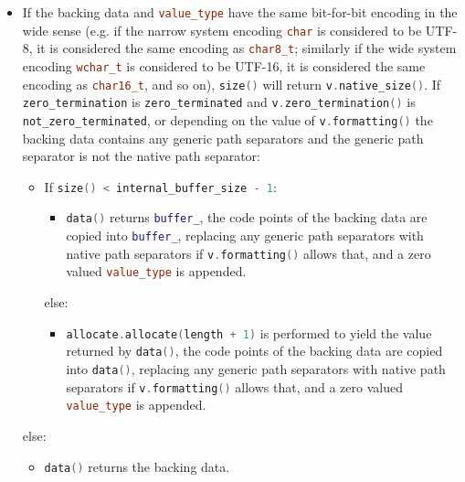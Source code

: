 \documentclass[11pt]{article}
\newcommand{\code}[2][cpp]{\lstinline[language=#1,basicstyle=\small\ttfamily]{#2}}
\newcommand{\note}[1]{\begin{quote}[\textit{Note:} #1 -- end note]\end{quote}}
\begin{document}
\begin{itemize}
\color{black}

\note{The \code{(v.native_size() + v.has_zero_termination()) != (size() + 1) * sizeof(value_type)} is to enable passthrough of byte input to \code{wchar_t} output by passing in an uneven sized byte input marked as zero terminated, whereby if the zero terminated byte is added into the input, the total sum of bytes equals exactly the number of bytes which the zero terminated output buffer would occupy. The inferred promise here is that the code which constructed the path view with raw bytes and zero termination has appropriately padded the end of the buffer with the right number of zero bytes to make up a null terminated \code{wchar_t}.}

\color{darkgreen}

    \item If the backing data and \code{value_type} have the same bit-for-bit encoding in the wide sense (e.g. if the narrow system encoding \code{char} is considered to be UTF-8, it is considered the same encoding as \code{char8_t}; similarly if the wide system encoding \code{wchar_t} is considered to be UTF-16, it is considered the same encoding as \code{char16_t}, and so on), \code{size()} will return \code{v.native_size()}. If \code{zero_termination} is \code{zero_terminated} and \code{v.zero_termination()} is \code{not_zero_terminated}, or depending on the value of \code{v.formatting()} the backing data contains any generic path separators and the generic path separator is not the native path separator:
    \begin{itemize}
        \item If \code{size() < internal_buffer_size - 1}:
        \begin{itemize}
            \item \code{data()} returns \code{buffer_}, the code points of the backing data are copied into \code{buffer_}, replacing any generic path separators with native path separators if \code{v.formatting()} allows that, and a zero valued \code{value_type} is appended. 
        \end{itemize}
        else:
        \begin{itemize}
            \item \code{allocate.allocate(length + 1)} is performed to yield the value returned by \code{data()}, the code points of the backing data are copied into \code{data()}, replacing any generic path separators with native path separators if \code{v.formatting()} allows that, and a zero valued \code{value_type} is appended.
        \end{itemize}
    \end{itemize}
    else:
    \begin{itemize}
        \item \code{data()} returns the backing data.
    \end{itemize}


\end{itemize}
\end{document}
